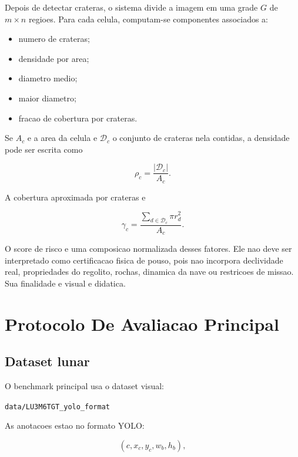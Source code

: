 \documentclass[12pt,a4paper]{article}
\begin{document}
Depois de detectar crateras, o sistema divide a imagem em uma grade $G$ de $m \times n$ regioes. Para cada celula, computam-se componentes associados a:

\begin{itemize}
    \item numero de crateras;
    \item densidade por area;
    \item diametro medio;
    \item maior diametro;
    \item fracao de cobertura por crateras.
\end{itemize}

Se $A_c$ e a area da celula e $\mathcal{D}_c$ o conjunto de crateras nela contidas, a densidade pode ser escrita como

\begin{equation}
\rho_c = \frac{|\mathcal{D}_c|}{A_c}.
\end{equation}

A cobertura aproximada por crateras e

\begin{equation}
\gamma_c = \frac{\sum_{d \in \mathcal{D}_c}\pi r_d^2}{A_c}.
\end{equation}

O score de risco e uma composicao normalizada desses fatores. Ele nao deve ser interpretado como certificacao fisica de pouso, pois nao incorpora declividade real, propriedades do regolito, rochas, dinamica da nave ou restricoes de missao. Sua finalidade e visual e didatica.

\section{Protocolo De Avaliacao Principal}

\subsection{Dataset lunar}

O benchmark principal usa o dataset visual:

\begin{center}
\texttt{data/LU3M6TGT\_yolo\_format}
\end{center}

As anotacoes estao no formato YOLO:

\begin{equation}
(c, x_c, y_c, w_b, h_b),
\end{equation}
\end{document}
